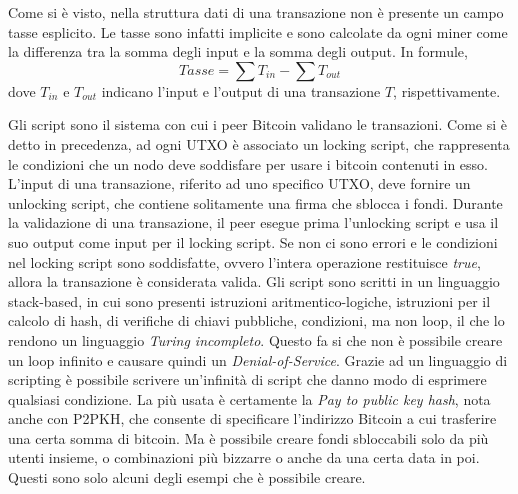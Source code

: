 Come si è visto, nella struttura dati di una transazione non è presente un campo tasse esplicito. Le tasse sono infatti implicite e sono calcolate da ogni miner come la differenza tra la somma degli input e la somma degli output. In formule,
\begin{equation*}
	Tasse = \sum T_{in} - \sum T_{out}
\end{equation*}
dove $T_{in}$ e $T_{out}$ indicano l'input e l'output di una transazione $T$, rispettivamente.

Gli script sono il sistema con cui i peer Bitcoin validano le transazioni. Come si è detto in precedenza, ad ogni UTXO è associato un locking script, che rappresenta le condizioni che un nodo deve soddisfare per usare i bitcoin contenuti in esso. L'input di una transazione, riferito ad uno specifico UTXO, deve fornire un unlocking script, che contiene solitamente una firma che sblocca i fondi. Durante la validazione di una transazione, il peer esegue prima l'unlocking script e usa il suo output come input per il locking script. Se non ci sono errori e le condizioni nel locking script sono soddisfatte, ovvero l'intera operazione restituisce \emph{true}, allora la transazione è considerata valida.
Gli script sono scritti in un linguaggio stack-based, in cui sono presenti istruzioni aritmentico-logiche, istruzioni per il calcolo di hash, di verifiche di chiavi pubbliche, condizioni, ma non loop, il che lo rendono un linguaggio \emph{Turing incompleto}. Questo fa si che non è possibile creare un loop infinito e causare quindi un \emph{Denial-of-Service}. Grazie ad un linguaggio di scripting è possibile scrivere un'infinità di script che danno modo di esprimere qualsiasi condizione. La più usata è certamente la \emph{Pay to public key hash}, nota anche con P2PKH, che consente di specificare l'indirizzo Bitcoin a cui trasferire una certa somma di bitcoin. Ma è possibile creare fondi sbloccabili solo da più utenti insieme, o combinazioni più bizzarre o anche da una certa data in poi. Questi sono solo alcuni degli esempi che è possibile creare.

